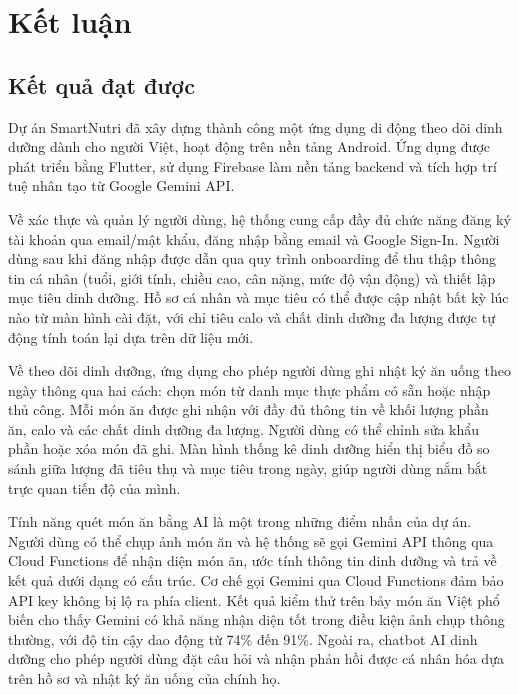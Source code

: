 
\chapter*{Kết luận}

\section*{Kết quả đạt được}

Dự án SmartNutri đã xây dựng thành công một ứng dụng di động theo dõi dinh dưỡng dành cho người Việt, hoạt động trên nền tảng Android. Ứng dụng được phát triển bằng Flutter, sử dụng Firebase làm nền tảng backend và tích hợp trí tuệ nhân tạo từ Google Gemini API.

Về xác thực và quản lý người dùng, hệ thống cung cấp đầy đủ chức năng đăng ký tài khoản qua email/mật khẩu, đăng nhập bằng email và Google Sign-In. Người dùng sau khi đăng nhập được dẫn qua quy trình onboarding để thu thập thông tin cá nhân (tuổi, giới tính, chiều cao, cân nặng, mức độ vận động) và thiết lập mục tiêu dinh dưỡng. Hồ sơ cá nhân và mục tiêu có thể được cập nhật bất kỳ lúc nào từ màn hình cài đặt, với chỉ tiêu calo và chất dinh dưỡng đa lượng được tự động tính toán lại dựa trên dữ liệu mới.

Về theo dõi dinh dưỡng, ứng dụng cho phép người dùng ghi nhật ký ăn uống theo ngày thông qua hai cách: chọn món từ danh mục thực phẩm có sẵn hoặc nhập thủ công. Mỗi món ăn được ghi nhận với đầy đủ thông tin về khối lượng phần ăn, calo và các chất dinh dưỡng đa lượng. Người dùng có thể chỉnh sửa khẩu phần hoặc xóa món đã ghi. Màn hình thống kê dinh dưỡng hiển thị biểu đồ so sánh giữa lượng đã tiêu thụ và mục tiêu trong ngày, giúp người dùng nắm bắt trực quan tiến độ của mình.

Tính năng quét món ăn bằng AI là một trong những điểm nhấn của dự án. Người dùng có thể chụp ảnh món ăn và hệ thống sẽ gọi Gemini API thông qua Cloud Functions để nhận diện món ăn, ước tính thông tin dinh dưỡng và trả về kết quả dưới dạng có cấu trúc. Cơ chế gọi Gemini qua Cloud Functions đảm bảo API key không bị lộ ra phía client. Kết quả kiểm thử trên bảy món ăn Việt phổ biến cho thấy Gemini có khả năng nhận diện tốt trong điều kiện ảnh chụp thông thường, với độ tin cậy dao động từ 74\% đến 91\%. Ngoài ra, chatbot AI dinh dưỡng cho phép người dùng đặt câu hỏi và nhận phản hồi được cá nhân hóa dựa trên hồ sơ và nhật ký ăn uống của chính họ.

